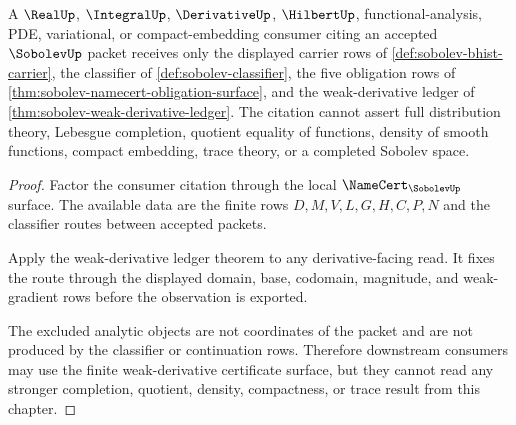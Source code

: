 \begin{theorem}
\label{thm:sobolev-completion-boundary}
A $\RealUp$, $\IntegralUp$, $\DerivativeUp$, $\HilbertUp$, functional-analysis, PDE, variational, or compact-embedding consumer citing an accepted $\SobolevUp$ packet receives only the displayed carrier rows of \autoref{def:sobolev-bhist-carrier}, the classifier of \autoref{def:sobolev-classifier}, the five obligation rows of \autoref{thm:sobolev-namecert-obligation-surface}, and the weak-derivative ledger of \autoref{thm:sobolev-weak-derivative-ledger}. The citation cannot assert full distribution theory, Lebesgue completion, quotient equality of functions, density of smooth functions, compact embedding, trace theory, or a completed Sobolev space.
\end{theorem}
\begin{proof}
Factor the consumer citation through the local $\NameCert_{\SobolevUp}$ surface. The available data are the finite rows $D,M,V,L,G,H,C,P,N$ and the classifier routes between accepted packets.

Apply the weak-derivative ledger theorem to any derivative-facing read. It fixes the route through the displayed domain, base, codomain, magnitude, and weak-gradient rows before the observation is exported.

The excluded analytic objects are not coordinates of the packet and are not produced by the classifier or continuation rows. Therefore downstream consumers may use the finite weak-derivative certificate surface, but they cannot read any stronger completion, quotient, density, compactness, or trace result from this chapter.
\end{proof}

